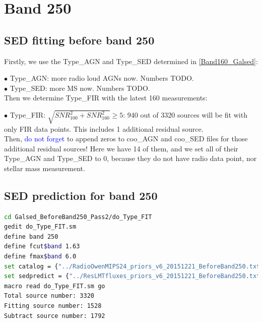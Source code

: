 \documentclass[11pt,a4paper]{article}
\begin{document}

\clearpage

\section{Band 250}

\subsection{SED fitting before band 250}
\label{Band250_Galsed}

Firstly, we use the Type\_AGN and Type\_SED determined in \ref{Band160_Galsed}:

\indent\hspace{15pt}$\bullet$ 
Type\_AGN: more radio loud AGNs now. Numbers TODO. 
\\
\indent\hspace{15pt}$\bullet$ 
Type\_SED: more MS now. Numbers TODO. 
\\

Then we determine Type\_FIR with the latest 160 measurements:

\indent\hspace{15pt}$\bullet$ 
Type\_FIR: $\sqrt{SNR_{100}^2+SNR_{160}^2} \ge 5$: 940 out of 3320 sources will be fit with only FIR data points. This includes 1 additional residual source. 
\\

Then, \textcolor{blue}{do not forget} to append zeros to coo\_AGN and coo\_SED files for those additional residual sources! Here we have 14 of them, and we set all of their Type\_AGN and Type\_SED to 0, because they do not have radio data point, nor stellar mass measurement. 

\subsection{SED prediction for band 250}
\label{Band250_Galpre}

\begin{lstlisting}[language=bash]
cd Galsed_BeforeBand250_Pass2/do_Type_FIT
gedit do_Type_FIT.sm
define band 250
define fcut$band 1.63
define fmax$band 6.0
set catalog = {"../RadioOwenMIPS24_priors_v6_20151221_BeforeBand250.txt"}
set sedpredict = {"../ResLMTfluxes_priors_v6_20151221_BeforeBand250.txt"}
macro read do_Type_FIT.sm go
Total source number: 3320
Fitting source number: 1528
Subtract source number: 1792
\end{lstlisting}
\end{document}
